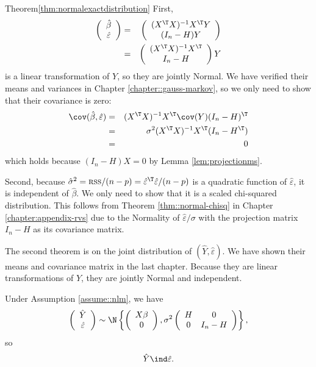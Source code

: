 \begin{myproof}{Theorem}{\ref{thm:normalexactdistribution}}
First, 
\begin{eqnarray*}
\left(\begin{array}{c}
\hat{\beta}\\
\hat{\varepsilon}
\end{array}\right)
&=&
\left(\begin{array}{c}
(X^{\T}X)^{-1}X^{\T}Y\\
(I_{n}-H)Y
\end{array}\right) \\
&=&\left(\begin{array}{c}
(X^{\T}X)^{-1}X^{\T}\\
I_{n}-H
\end{array}\right)Y
\end{eqnarray*}
is a linear transformation of $Y$, so they are jointly Normal. We have verified their means and variances in Chapter \ref{chapter::gauss-markov}, so we only need to show that their covariance is zero:
\begin{eqnarray*}
\cov(\hat{\beta},\hat{\varepsilon})
&=&(X^{\T}X)^{-1}X^{\T}\cov(Y)(I_{n}-H)^{\T}\\
&=&\sigma^{2}(X^{\T}X)^{-1}X^{\T}(I_{n}-H^{\T}) \\
&=&0
\end{eqnarray*}
which holds because $(I_{n}-H)X=0$ by Lemma \ref{lem:projectionms}.

 

Second, because $\hat{\sigma}^{2}=\textsc{rss}/(n-p)=\hat{\varepsilon}^{\T}\hat{\varepsilon}/(n-p)$
is a quadratic function of $\hat{\varepsilon}$, it is independent
of $\hat{\beta}$. We only need to show that it is a scaled chi-squared
distribution. This follows from Theorem \ref{thm::normal-chisq} in Chapter \ref{chapter:appendix-rvs}  due to the Normality of $\hat{\varepsilon}/\sigma$
with the projection matrix $I_{n}-H$ as its covariance matrix. 
\end{myproof}



The second theorem is on the joint distribution of $(\hat{Y},\hat{\varepsilon}).$
We have shown their means and covariance matrix in the last chapter.
Because they are linear transformations of $Y$, they are jointly Normal
and independent. 
\begin{theorem}\label{thm::gaussianlm-independence-ye}
Under Assumption \ref{assume::nlm}, we have 
\[
\left(\begin{array}{c}
\hat{Y}\\
\hat{\varepsilon}
\end{array}\right)\sim\N\left\{ \left(\begin{array}{c}
X\beta\\
0
\end{array}\right),\sigma^{2}\left(\begin{array}{cc}
H & 0\\
0 & I_{n}-H
\end{array}\right)\right\} ,
\]
so 
$$
\hat{Y}\ind\hat{\varepsilon}.
$$
\end{theorem}
 

